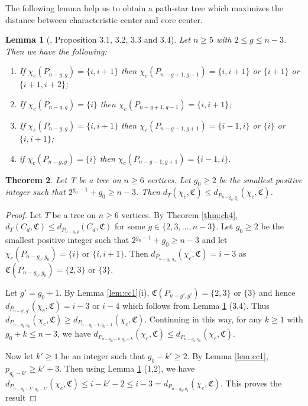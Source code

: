 \documentclass[11pt]{article}
\newtheorem{theorem}{Theorem}[section]
\newtheorem{lemma}[theorem]{Lemma}
\begin{document}
The following  lemma help us to obtain a path-star tree which maximizes the distance between characteristic center and core center.

\begin{lemma}[\cite{Klp}, Proposition 3.1, 3.2, 3.3 and 3.4]\label{lem:ch2}
Let $n\geq 5$ with $2\leq g\leq n-3$. Then we have the following:
\begin{enumerate}
\item If $\chi_c(P_{n-g,g})= \{i,i+1\}$  then $\chi_c(P_{n-g+1,g-1})=\{i,i+1\}$ or $\{ i+1 \}$ or $\{i+1,i+2\}$;
 
\item If $\chi_c(P_{n-g,g})= \{i\}$  then $\chi_c(P_{n-g+1,g-1})=\{i,i+1\}$;

\item If $\chi_c(P_{n-g,g})= \{i,i+1\}$    then $\chi_c(P_{n-g-1,g+1})=\{i-1,i\}$ or $\{i\}$ or $\{i,i+1\}$;

\item if $\chi_c(P_{n-g,g})= \{i\}$  then $\chi_c(P_{n-g-1,g+1})=\{i-1,i\}$.
\end{enumerate}  
\end{lemma}


\begin{theorem}\label{thm:ch5}
Let T be a tree on $n\geq 6$ vertices. Let $g_0\geq 2$ be the smallest positive integer such that $2^{g_0-1}+g_0\geq n-3$. Then  $d_T(\chi_c,\mathfrak{C})\leq d_{P_{n-g_0,g_0}}(\chi_c,\mathfrak{C})$.
\end{theorem}
\begin{proof}
Let $T$ be a tree on $n\geq 6$ vertices. By Theorem \ref{thm:ch4}, $d_T(C_d,\mathfrak{C})\leq d_{P_{n-g,g}}(C_d,\mathfrak{C})$ for some $g\in \{2,3,\ldots,n-3\}$. Let $g_0\geq 2$ be the smallest positive integer such that $2^{g_0-1}+g_0\geq n-3$  and let $\chi_c(P_{n-g_0,g_0})= \{i\}$ or $\{i,i+1\}$. Then $d_{P_{n-g_0,g_0}}(\chi_c,\mathfrak{C})=i-3$ as $\mathfrak{C}(P_{n-g_0,g_0})=\{2,3\}$ or $\{3\}$.

Let $g'=g_0+1$. By Lemma \ref{lem:cc1}(i), $\mathfrak{C}(P_{n-g',g'})=\{2,3\}$ or $\{3\}$ and hence $d_{P_{n-g',g'}}(\chi_c,\mathfrak{C})=i-3$ or $i-4$ which follows from Lemma \ref{lem:ch2} (3,4). Thus $d_{P_{n-g_0,g_0}}(\chi_c,\mathfrak{C})\geq d_{P_{n-g_0-1,g_0+1}}(\chi_c,\mathfrak{C})$. Continuing in this way, for any $k\geq 1$ with $g_0+k\leq n-3$, we have $d_{P_{n-g_0-k,g_0+k}}(\chi_c, \mathfrak{C})\leq d_{P_{n-g_0,g_0}}(\chi_c, \mathfrak{C})$.

Now let $k'\geq 1$ be an integer such that $g_0-k'\geq 2$.  By Lemma \ref{lem:cc1}, $ p_{g_0-k'}\geq k'+3$.
Then using Lemma \ref{lem:ch2} (1,2), we have $d_{P_{n-g_0+k',g_0-k'}}(\chi_c, \mathfrak{C})\leq i-k'-2\leq i-3 = d_{P_{n-g_0,g_0}}(\chi_c, \mathfrak{C})$. This proves the result
\end{proof}
\end{document}
